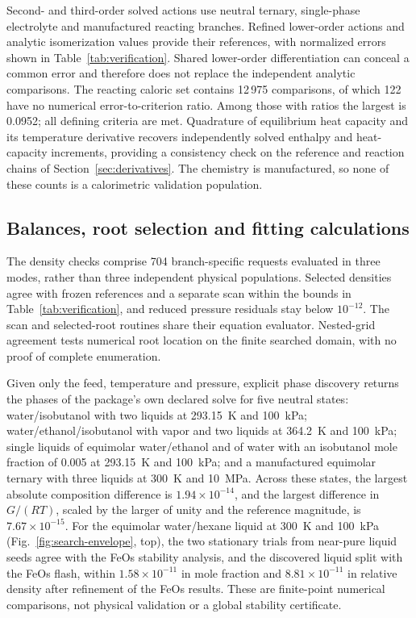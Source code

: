 Second- and third-order solved actions use neutral ternary, single-phase electrolyte and manufactured reacting branches.
Refined lower-order actions and analytic isomerization values provide their references, with normalized errors shown in Table~\ref{tab:verification}.
Shared lower-order differentiation can conceal a common error and therefore does not replace the independent analytic comparisons.
The reacting caloric set contains 12\,975 comparisons, of which 122 have no numerical error-to-criterion ratio.
Among those with ratios the largest is 0.0952; all defining criteria are met.
Quadrature of equilibrium heat capacity and its temperature derivative recovers independently solved enthalpy and heat-capacity increments, providing a consistency check on the reference and reaction chains of Section~\ref{sec:derivatives}.
The chemistry is manufactured, so none of these counts is a calorimetric validation population.



\subsection{Balances, root selection and fitting calculations}
\label{sec:balances}
The density checks comprise 704 branch-specific requests evaluated in three modes, rather than three independent physical populations.
Selected densities agree with frozen references and a separate scan within the bounds in Table~\ref{tab:verification}, and reduced pressure residuals stay below $10^{-12}$.
The scan and selected-root routines share their equation evaluator.
Nested-grid agreement tests numerical root location on the finite searched domain, with no proof of complete enumeration.

Given only the feed, temperature and pressure, explicit phase discovery returns the phases of the package's own declared solve for five neutral states: water/isobutanol with two liquids at 293.15~K and 100~kPa; water/ethanol/isobutanol with vapor and two liquids at 364.2~K and 100~kPa; single liquids of equimolar water/ethanol and of water with an isobutanol mole fraction of 0.005 at 293.15~K and 100~kPa; and a manufactured equimolar ternary with three liquids at 300~K and 10~MPa.
Across these states, the largest absolute composition difference is $1.94\times10^{-14}$, and the largest difference in $G/(RT)$, scaled by the larger of unity and the reference magnitude, is $7.67\times10^{-15}$.
For the equimolar water/hexane liquid at 300~K and 100~kPa (Fig.~\ref{fig:search-envelope}, top), the two stationary trials from near-pure liquid seeds agree with the FeOs stability analysis, and the discovered liquid split with the FeOs flash, within $1.58\times10^{-11}$ in mole fraction and $8.81\times10^{-11}$ in relative density after refinement of the FeOs results.
These are finite-point numerical comparisons, not physical validation or a global stability certificate.

